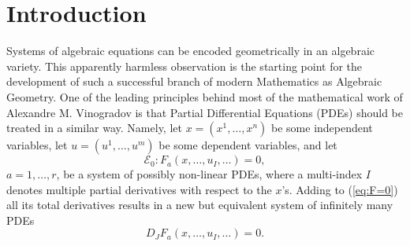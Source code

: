\documentclass{conm-p-l}
\theoremstyle{definition}
\theoremstyle{remark}
\numberwithin{equation}{section}
\begin{document}
\maketitle

\section*{Introduction}

Systems of algebraic equations can be encoded geometrically in an algebraic variety. This apparently harmless observation is the starting point for the development of such a successful branch of modern Mathematics as Algebraic Geometry. One of the leading principles behind most of the mathematical work of Alexandre M. Vinogradov is that Partial Differential Equations (PDEs) should be treated in a similar way. Namely, let $x = (x^1, \ldots, x^n)$ be some independent variables, let $u = (u^1, \ldots, u^m)$ be some dependent variables, and let 
%
\begin{equation}\label{eq:F=0}
\mathscr E_0 : F_a (x, \ldots, u_I, \ldots) = 0,
\end{equation}
%
$a = 1, \ldots, r$, be a system of possibly non-linear PDEs, where a multi-index $I$ denotes multiple partial derivatives with respect to the $x$'s. Adding to (\ref{eq:F=0}) all its total derivatives results in a new but equivalent system of infinitely many PDEs
%
\begin{equation}\label{eq:DF=0}
D_J F_a (x, \ldots, u_I, \ldots) = 0.
\end{equation}
%
\end{document}
